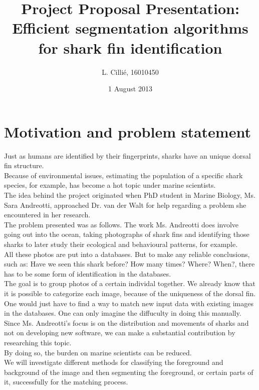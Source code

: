\documentclass[a4paper,10pt]{article}
\title{Project Proposal Presentation: Efficient segmentation algorithms for
shark fin identification}
\author{L. Cilli\'{e}, 16010450}
\date{1 August 2013}
\begin{document}
\maketitle
\section{Motivation and problem statement}
Just as humans are identified by their fingerprints, sharks have an unique
dorsal fin structure.  \\

Because of environmental issues, estimating the
population of a specific shark species, for example, has become a hot topic
under
marine scientists. \\

The idea behind the project originated when PhD
student in Marine Biology, Ms. Sara Andreotti, approached Dr. van der Walt for
help
regarding a problem she encountered in her research. \\ 

The problem presented was
as follows.  The work Ms. Andreotti does involve going out into the ocean,
taking photographs of shark fins and identifying those sharks to later study their ecological and behavioural
patterns, for example. \\

All these photos are put into a databases. But to
make any reliable conclusions, such as: Have we seen this shark before?  How
many
times? Where? When?, there has to be some form of identification in the
databases. \\

The goal is to group photos of a certain individal together.  We
already know that it is possible to categorize each image, because of the
uniqueness of the dorsal fin.  One would just have to find a way to match new
input data with existing images in the databases.  One can only imagine the
diffuculty in doing this manually. \\

Since Ms. Andreotti's
focus is on the distribution and movements of sharks and not on developing new
software, we can make a substantial contribution by researching this topic. \\

By doing so, the burden on marine scientists can be 
reduced.
 \\

We will investigate different
methods for classifying the foreground and background of the image
and then segmenting the foreground, or certain parts of it, successfully for the
matching process.  
\end{document}
